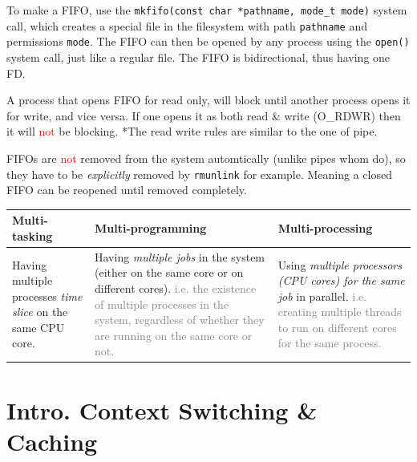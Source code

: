 \documentclass[openany,12pt]{book}
\newcommand{\code}[1]{\texttt{#1}}
\newcommand{\red}[1]{\textcolor{Red}{#1}}
\newcommand{\gray}[1]{\textcolor{gray}{#1}}
\begin{document}
To make a FIFO, use the \code{mkfifo(const char *pathname, mode\_t mode)} system call, which creates a special file in the filesystem with path \code{pathname} and permissions \code{mode}. The FIFO can then be opened by any process using the \code{open()} system call, just like a regular file. The FIFO is bidirectional, thus having one FD. 

A process that opens FIFO for read only, will block until another process opens it for write, and vice versa. If one opens it as both read \& write (O\_RDWR) then it will \red{not} be blocking. *The read write rules are similar to the one of pipe.

FIFOs are \red{not} removed from the system automtically (unlike pipes whom do), so they have to be \textit{explicitly} removed by \code{rm}\code{unlink} for example. Meaning a closed FIFO can be reopened until removed completely.

\begin{samepage}
  \begin{center}
    \begin{tabular}{|>{\raggedright\arraybackslash}p{4cm}|
      >{\raggedright\arraybackslash}p{6cm}|
      >{\raggedright\arraybackslash}p{5cm}|}
      \hline
      \rowcolor{blue!30}
      \textbf{Multi-tasking} & \textbf{Multi-programming} & \textbf{Multi-processing} \\
      \hline
      Having multiple processes \textit{time slice} on the same CPU core.
                             &
      Having \textit{multiple jobs} in the system (either on the same core or on different cores). \gray{i.e. the existence of multiple processes in the system, regardless of whether they are running on the same core or not.}
                             &
      Using \textit{multiple processors (CPU cores) for the same job} in parallel. \gray{i.e. creating multiple threads to run on different cores for the same process.}
      \\
      \hline
    \end{tabular}
  \end{center}
\end{samepage}





\newpage
\section*{Intro. Context Switching \& Caching}
\end{document}
